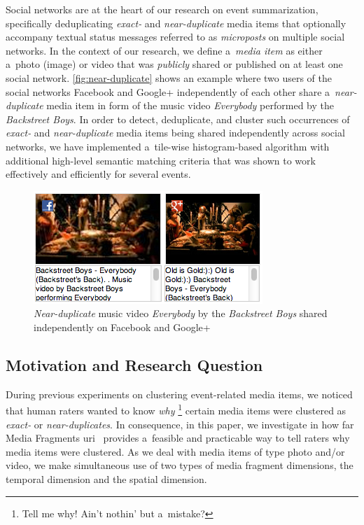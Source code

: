 \documentclass{article}
\begin{document}
Social networks are at the heart of our research on event summarization,
specifically deduplicating \emph{exact-} and \emph{near-duplicate}
media items that optionally accompany textual status messages
referred to as \emph{microposts} on multiple social networks. 
In the context of our research, we define a~\emph{media item}
as either a~photo (image) or video
that was \emph{publicly} shared or published
on at least one social network.
\autoref{fig:near-duplicate} shows an example
where two users of the social networks Facebook and Google+
independently of each other share a~\emph{near-duplicate} media item
in form of the music video \emph{Everybody}
performed by the \emph{Backstreet Boys}.
In order to detect, deduplicate, and cluster such occurrences
of \emph{exact-} and \emph{near-duplicate}
media items being shared independently across social networks,
we have implemented a~tile-wise histogram-based algorithm
with additional high-level semantic matching criteria
that was shown to work effectively and efficiently for several events.

\begin{figure}[b!]
  \centering
  \includegraphics[width=0.75\linewidth]{./backstreetboys.png}
  \caption{\emph{Near-duplicate} music video \emph{Everybody}
    by the \emph{Backstreet Boys} shared
    independently on Facebook and Google+}
  \label{fig:near-duplicate}
\end{figure}

\subsection{Motivation and Research Question}
\label{sec:motivation-and-research-question}

During previous experiments on clustering event-related media items,
we noticed that human raters wanted to know \emph{why}%
\footnote{Tell me why! Ain't nothin' but a~mistake?}
certain media items were clustered as \emph{exact-} or \emph{near-duplicates}.
In consequence, in this paper, we investigate in how far
Media Fragments {\sc uri}~\cite{troncy2012mediafragments}
provides a~feasible and practicable way
to tell raters why media items were clustered.
As we deal with media items of type photo and/or video,
we make simultaneous use of two types of media fragment dimensions,
the temporal dimension and the spatial dimension.
\end{document}
